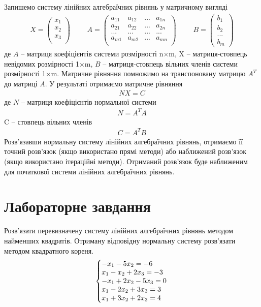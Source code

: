\documentclass{article}
\begin{document}
\begin{large}
		Запишемо систему лінійних алгебраїчних рівнянь у матричному
		вигляді
		\begin{gather}\nonumber
			X=\begin{pmatrix}
				x_1\\
				x_2\\
				x_3\\
			\end{pmatrix}
			\hspace{28pt}
			A=\begin{pmatrix}
				a_{11} & a_{12} & ... & a_{1n}\\
				a_{21} & a_{22} & ... & a_{2n}\\
				... & ... & ... & ...\\
				a_{m1} & a_{m2} & ... & a_{mn}\\	
			\end{pmatrix}
			\hspace{28pt}
			B=\begin{pmatrix}
				b_1\\
				b_2\\
				...\\
				b_m
			\end{pmatrix}
		\end{gather}
		де $A$ – матриця коефіцієнтів системи розмірності n×m, X – матриця-стовпець невідомих розмірності 1×m, $B$ – матриця-стовпець вільних членів системи розмірності 1×m.
		Матричне рівняння помножимо на транспоновану матрицю $A^T$ до
		матриці $A$. У результаті отримаємо матричне рівняння
		\begin{gather}
			NX=C\nonumber
		\end{gather}
		де $N$ – матриця коефіцієнтів нормальної системи
		\begin{gather}
			N=A^TA\nonumber
		\end{gather}
		C – стовпець вільних членів
		\begin{gather}
			C=A^TB\nonumber
		\end{gather}
		Розв’язавши нормальну систему лінійних алгебраїчних рівнянь,
		отримаємо її точний розв’язок (якщо використано прямі методи) або
		наближений розв’язок (якщо використано ітераційні методи). Отриманий
		розв’язок буде наближеним для початкової системи лінійних алгебраїчних рівнянь.
		\section*{Лабораторне завдання}
		Розв’язати перевизначену систему лінійних алгебраїчних рівнянь
		методом найменших квадратів. Отриману відповідну нормальну систему
		розв’язати методом квадратного кореня.
		\begin{gather}
			\left\{\begin{array}{@{}l@{}}
				-x_1-5x_2=-6\\\nonumber
				x_1-x_2+2x_3=-3\\\nonumber
				-x_1+2x_2-5x_3=0\\\nonumber
				x_1-2x_2+3x_3=3\\\nonumber
				x_1+3x_2+2x_3=4\nonumber
			\end{array}\right.\,		
		\end{gather}

\end{large}
\end{document}
